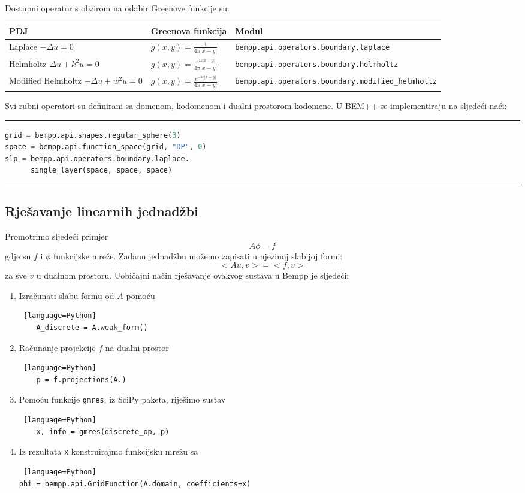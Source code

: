 \documentclass[a4paper,twoside,12pt]{memoir} %
\begin{document}
 Dostupni operator s obzirom na odabir Greenove funkcije su:
\begin{table}[H]
\begin{tabular}{m{2.5cm} m{3cm} m{8cm}}\\
\large{PDJ} & \large{Greenova funkcija} & \large{Modul} \\
\hline
Laplace $-\Delta u=0$ & $g(x,y)=\frac{1}{4\pi|x-y|}$ & \texttt{bempp.api.operators.boundary,laplace}\\
\hline
Helmholtz $\Delta u+k^{2}u=0$ & $g(x,y)=\frac{e^{ik|x-y|}}{4\pi|x-y|}$ & \texttt{bempp.api.operators.boundary.helmholtz} \\
\hline
Modified \newline Helmholtz $-\Delta u + w^{2}u=0$ & $g(x,y)=\frac{e^{-w|x-y|}}{4\pi|x-y|}$ & \texttt{bempp.api.operators.boundary.modified\_helmholtz}
\end{tabular}
\end{table}
Svi rubni operatori su definirani sa domenom, kodomenom i dualni prostorom kodomene. U BEM++ se implementiraju na sljedeći naći:\\

\hrule
\begin{lstlisting}[language=Python]
grid = bempp.api.shapes.regular_sphere(3)
space = bempp.api.function_space(grid, "DP", 0)
slp = bempp.api.operators.boundary.laplace.
      single_layer(space, space, space)
\end{lstlisting}
\hrule

\subsection{Rješavanje linearnih jednadžbi}

Promotrimo sljedeći primjer $$A\phi=f $$  gdje su $f$ i $\phi$ funkcijske mreže. Zadanu jednadžbu možemo zapisati u njezinoj slabijoj formi: $$<Au,v>=<f,v>$$ za sve $v$ u dualnom prostoru. Uobičajni način rješavanje ovakvog sustava u Bempp je sljedeći:
\begin{enumerate}
	\item{ Izračunati slabu formu od $A$ pomoću 
	\begin{lstlisting} [language=Python]
	A_discrete = A.weak_form()
	\end{lstlisting}
	}
	\item{ Računanje projekcije $f$ na dualni prostor 
	\begin{lstlisting} [language=Python]
	p = f.projections(A.)
	\end{lstlisting}}
	\item{
	Pomoću funkcije \texttt{gmres}, iz SciPy paketa, riješimo sustav 
	\begin{lstlisting} [language=Python]
	x, info = gmres(discrete_op, p)
	\end{lstlisting}
	}
	\item{
	Iz rezultata \texttt{x} konstruirajmo funkcijsku mrežu sa
	\begin{lstlisting} [language=Python]
phi = bempp.api.GridFunction(A.domain, coefficients=x)
	\end{lstlisting}
	}
	
\end{enumerate}
  
\end{document}
